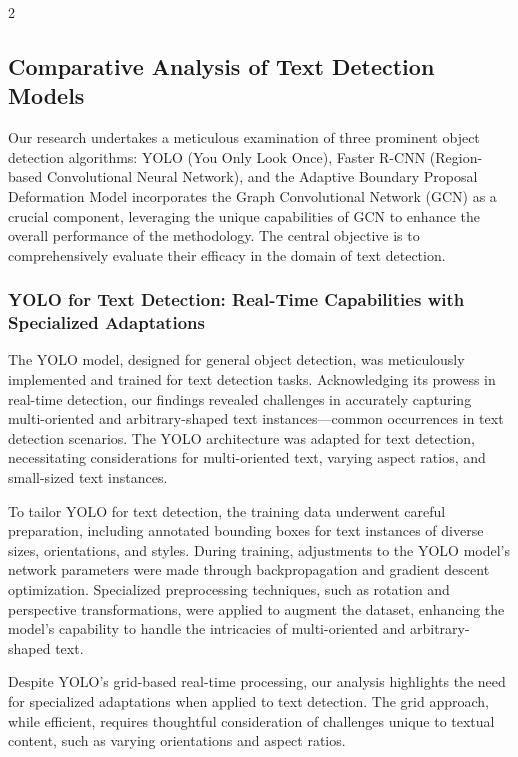 \documentclass[sn-mathphys,Numbered]{sn-jnl}%
\begin{document}
\begin{multicols}{2}
\subsection{Comparative Analysis of Text Detection Models}

Our research undertakes a meticulous examination of three prominent object detection algorithms: YOLO (You Only Look Once), Faster R-CNN (Region-based Convolutional Neural Network), and the Adaptive Boundary Proposal Deformation Model incorporates the Graph Convolutional Network (GCN) as a crucial component, leveraging the unique capabilities of GCN to enhance the overall performance of the methodology. The central objective is to comprehensively evaluate their efficacy in the domain of text detection.

\subsubsection{YOLO for Text Detection: Real-Time Capabilities with Specialized Adaptations}

The YOLO model, designed for general object detection, was meticulously implemented and trained for text detection tasks. Acknowledging its prowess in real-time detection, our findings revealed challenges in accurately capturing multi-oriented and arbitrary-shaped text instances—common occurrences in text detection scenarios. The YOLO architecture was adapted for text detection, necessitating considerations for multi-oriented text, varying aspect ratios, and small-sized text instances.

To tailor YOLO for text detection, the training data underwent careful preparation, including annotated bounding boxes for text instances of diverse sizes, orientations, and styles. During training, adjustments to the YOLO model's network parameters were made through backpropagation and gradient descent optimization. Specialized preprocessing techniques, such as rotation and perspective transformations, were applied to augment the dataset, enhancing the model's capability to handle the intricacies of multi-oriented and arbitrary-shaped text.

Despite YOLO's grid-based real-time processing, our analysis highlights the need for specialized adaptations when applied to text detection. The grid approach, while efficient, requires thoughtful consideration of challenges unique to textual content, such as varying orientations and aspect ratios.


\end{multicols}
\end{document}
